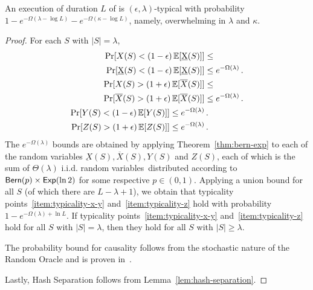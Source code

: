 \begin{theorem}[Typicality]
  An execution of duration $L$ of \poem is $(\epsilon, \lambda)$-typical with
  probability $1 - e^{-\Omega(\lambda - \log L)} - e^{-\Omega(\kappa - \log L)}$,
  namely, overwhelming in $\lambda$ and $\kappa$.
\end{theorem}
\begin{proof}
  For each $S$ with $|S| = \lambda$,
  \begin{align*}
    \Pr[X(S) < (1 - \epsilon)\mathop{{}\mathbb{E}}[\underbar{X}(S)]] &\leq\\
    \Pr[\underbar{X}(S) < (1 - \epsilon)\mathop{{}\mathbb{E}}[\underbar{X}(S)]] &\leq
    e^{-\Omega(\lambda)} \,.\\
    \Pr[X(S) > (1 + \epsilon)\mathop{{}\mathbb{E}}[\overline{X}(S)]] &\leq\\
    \Pr[\overline{X}(S) > (1 + \epsilon)\mathop{{}\mathbb{E}}[\overline{X}(S)]] &\leq
    e^{-\Omega(\lambda)} \,.\\
    \Pr[Y(S) < (1 - \epsilon)\mathop{{}\mathbb{E}}[Y(S)]] \leq e^{-\Omega(\lambda)} &\,.\\
    \Pr[Z(S) > (1 + \epsilon)\mathop{{}\mathbb{E}}[Z(S)]] \leq e^{-\Omega(\lambda)} &\,.\\
  \end{align*}
  The $e^{-\Omega(\lambda)}$ bounds are obtained by applying
  Theorem~\ref{thm:bern-exp} to each of the random variables
  $\underbar{X}(S), \overline{X}(S), Y(S)$ and $Z(S)$, each
  of which is the sum of $\Theta(\lambda)$ i.i.d. random variables\
  distributed according to $\textsf{Bern}(p) \times \textsf{Exp}(\ln2)$ for
  some respective $p \in (0, 1)$.
  Applying a union bound for all $S$ (of which there are $L - \lambda + 1$),
  we obtain that typicality
  points~\ref{item:typicality-x-y} and~\ref{item:typicality-z}
  hold with probability $1 - e^{-\Omega(\lambda)+\ln L}$.
  If typicality points~\ref{item:typicality-x-y} and~\ref{item:typicality-z}
  hold for all $S$ with $|S| = \lambda$, then they hold for all $S$ with
  $|S| \geq \lambda$.

  The probability bound for causality follows from the stochastic nature
  of the Random Oracle and is proven in~\cite{backbone}.

  Lastly, Hash Separation follows from Lemma~\ref{lem:hash-separation}.
  \Qed
\end{proof}

